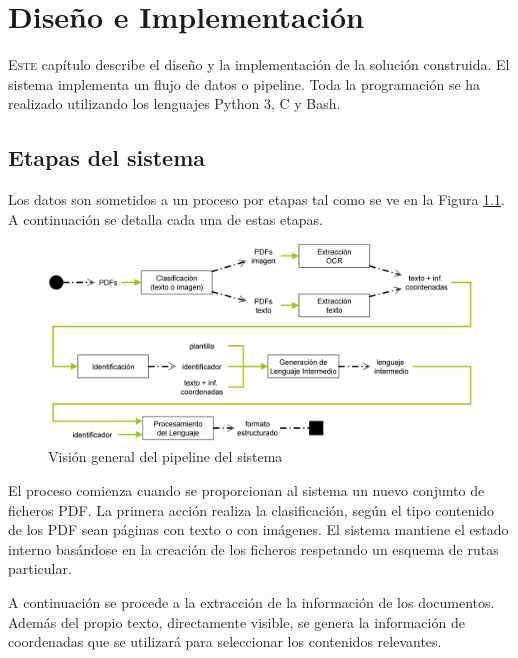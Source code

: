 
\chapter{Diseño e Implementación}
\label{chap:implemetación}

\lettrine{E}{ste} capítulo describe el diseño y la implementación de la solución construida. El sistema implementa un flujo de datos o pipeline. Toda la programación se ha realizado utilizando los lenguajes Python 3, C y Bash.

\section{Etapas del sistema}

Los datos son sometidos a un proceso por etapas tal como se ve en la Figura \ref{fig:vision-general-del-sistema}. A continuación se detalla cada una de estas etapas.

\begin{figure}[hp!]
    \centering
    \includegraphics[width=1.0\textwidth]{imaxes/h-implementacion/vision-general-del-sistema-2}
    \caption{Visión general del pipeline del sistema}
    \label{fig:vision-general-del-sistema}
\end{figure}

El proceso comienza cuando se proporcionan al sistema un nuevo conjunto de ficheros PDF. La primera acción realiza la clasificación, según el tipo contenido de los PDF sean páginas con texto o con imágenes. El sistema mantiene el estado interno basándose en la creación de los ficheros respetando un esquema de rutas particular.

A continuación se procede a la extracción de la información de los documentos. Además del propio texto, directamente visible, se genera la información de coordenadas que se utilizará para seleccionar los contenidos relevantes.

